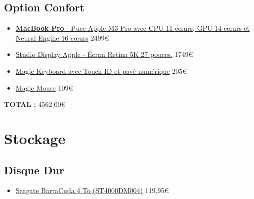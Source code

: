 \subsection{Option Confort}
\begin{itemize}
	\item \href{https://www.apple.com/fr/shop/buy-mac/macbook-pro/14-pouces-noir-sid%C3%A9ral-puce-apple-m3-pro-avec-cpu-11-c%C5%93urs-et-gpu-14-c%C5%93urs-18-go-de-m%C3%A9moire-512go}{\textbf{MacBook Pro} - Puce Apple M3 Pro avec CPU 11 cœurs, GPU 14 cœurs et Neural Engine 16 cœurs} 2499\euro
	\item \href{https://www.apple.com/fr/shop/buy-mac/apple-studio-display/verre-standard-support-%C3%A0-inclinaison-r%C3%A9glable?fnode=b1c4515e15fb3ab33e6a07516ca40f945833f716f28c671ebeacbedfa2df014311a0be8d92e138007282e9ad79bba4a1e16df92362e2652a46fac7f4dc93d4e49b3fc582752eef647c9ef89d1bb0398aee438bd689f6bdbc27ee1cf86c51881f}{Studio Display Apple - Écran Retina 5K 27 pouces.} 1749\euro
	\item \href{https://www.apple.com/fr/shop/product/MMMR3F/A/magic-keyboard-avec-touch-id-et-pav%C3%A9-num%C3%A9rique-pour-les-mac-avec-puce-apple-fran%C3%A7ais-touches-noires?fnode=b1c4515e15fb3ab33e6a07516ca40f945833f716f28c671ebeacbedfa2df014311a0be8d92e138007282e9ad79bba4a1e16df92362e2652a46fac7f4dc93d4e49b3fc582752eef647c9ef89d1bb0398aee438bd689f6bdbc27ee1cf86c51881f}{Magic Keyboard avec Touch ID et pavé numérique} 205\euro
	\item \href{https://www.apple.com/fr/shop/product/MMMQ3Z/A/magic-mouse-surface-multi-touch-noir?fnode=b1c4515e15fb3ab33e6a07516ca40f945833f716f28c671ebeacbedfa2df014311a0be8d92e138007282e9ad79bba4a1e16df92362e2652a46fac7f4dc93d4e49b3fc582752eef647c9ef89d1bb0398aee438bd689f6bdbc27ee1cf86c51881f}{Magic Mouse} 109\euro
\end{itemize}
\vspace{5px}
\textbf{TOTAL :} 4562,00\euro

\section{Stockage}

\subsection{Disque Dur}

\begin{itemize}
	\item\href{https://www.ldlc.com/fiche/PB00234144.html}{Seagate BarraCuda 4 To (ST4000DM004)} 119,95\euro
\end{itemize}

